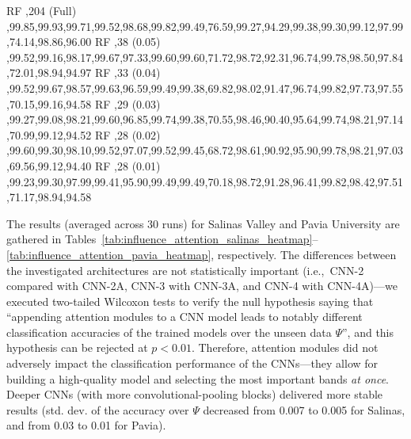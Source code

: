 \documentclass[journal]{IEEEtran}
\newcommand{\TestSet}{\Psi}
\begin{document}
\begin{table*}[ht!]
{RF	,204 (Full)	,99.85,99.93,99.71,99.52,98.68,99.82,99.49,76.59,99.27,94.29,99.38,99.30,99.12,97.99,74.14,98.86,96.00
RF	,38 (0.05)	,99.52,99.16,98.17,99.67,97.33,99.60,99.60,71.72,98.72,92.31,96.74,99.78,98.50,97.84,72.01,98.94,94.97
RF	,33 (0.04)	,99.52,99.67,98.57,99.63,96.59,99.49,99.38,69.82,98.02,91.47,96.74,99.82,97.73,97.55,70.15,99.16,94.58
RF	,29 (0.03)	,99.27,99.08,98.21,99.60,96.85,99.74,99.38,70.55,98.46,90.40,95.64,99.74,98.21,97.14,70.99,99.12,94.52
RF	,28 (0.02)	,99.60,99.30,98.10,99.52,97.07,99.52,99.45,68.72,98.61,90.92,95.90,99.78,98.21,97.03,69.56,99.12,94.40
RF	,28 (0.01)	,99.23,99.30,97.99,99.41,95.90,99.49,99.49,70.18,98.72,91.28,96.41,99.82,98.42,97.51,71.17,98.94,94.58
}\vrule
\end{table*}

The results (averaged across 30 runs) for Salinas Valley and Pavia University are gathered in Tables~\ref{tab:influence_attention_salinas_heatmap}--\ref{tab:influence_attention_pavia_heatmap}, respectively. The differences between the investigated architectures are not statistically important (i.e.,~CNN-2 compared with CNN-2A, CNN-3 with CNN-3A, and CNN-4 with CNN-4A)---we executed two-tailed Wilcoxon tests to verify the null hypothesis saying that ``appending attention modules to a CNN model leads to notably different classification accuracies of the trained models over the unseen data $\TestSet$'', and this hypothesis can be rejected at $p<0.01$. Therefore, attention modules did not adversely impact the classification performance of the CNNs---they allow for building a high-quality model and selecting the most important bands \emph{at once}. Deeper CNNs (with more convolutional-pooling blocks) delivered more stable results (std. dev. of the accuracy over $\TestSet$ decreased from 0.007 to 0.005 for Salinas, and from 0.03 to 0.01 for Pavia).
\end{document}
